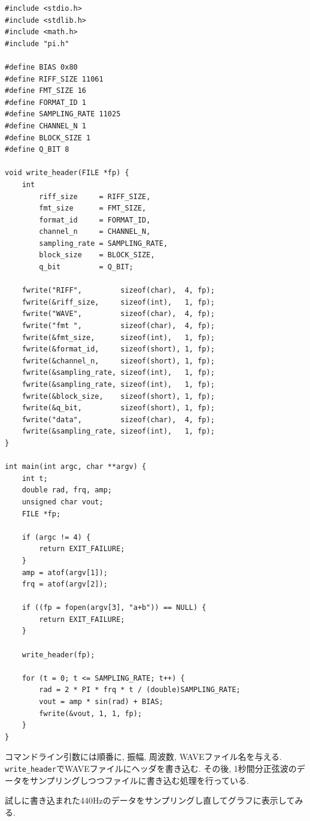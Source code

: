 \documentclass[titlepage]{jsarticle}
\begin{document}
        \begin{lstlisting}[caption=rec-m8.c, label=src:rec]
#include <stdio.h>
#include <stdlib.h>
#include <math.h>
#include "pi.h"

#define BIAS 0x80
#define RIFF_SIZE 11061
#define FMT_SIZE 16
#define FORMAT_ID 1
#define SAMPLING_RATE 11025
#define CHANNEL_N 1
#define BLOCK_SIZE 1
#define Q_BIT 8

void write_header(FILE *fp) {
    int
        riff_size     = RIFF_SIZE,
        fmt_size      = FMT_SIZE,
        format_id     = FORMAT_ID,
        channel_n     = CHANNEL_N,
        sampling_rate = SAMPLING_RATE,
        block_size    = BLOCK_SIZE,
        q_bit         = Q_BIT;

    fwrite("RIFF",         sizeof(char),  4, fp);
    fwrite(&riff_size,     sizeof(int),   1, fp);
    fwrite("WAVE",         sizeof(char),  4, fp);
    fwrite("fmt ",         sizeof(char),  4, fp);
    fwrite(&fmt_size,      sizeof(int),   1, fp);
    fwrite(&format_id,     sizeof(short), 1, fp);
    fwrite(&channel_n,     sizeof(short), 1, fp);
    fwrite(&sampling_rate, sizeof(int),   1, fp);
    fwrite(&sampling_rate, sizeof(int),   1, fp);
    fwrite(&block_size,    sizeof(short), 1, fp);
    fwrite(&q_bit,         sizeof(short), 1, fp);
    fwrite("data",         sizeof(char),  4, fp);
    fwrite(&sampling_rate, sizeof(int),   1, fp);
}

int main(int argc, char **argv) {
    int t;
    double rad, frq, amp;
    unsigned char vout;
    FILE *fp;

    if (argc != 4) {
        return EXIT_FAILURE;
    }
    amp = atof(argv[1]);
    frq = atof(argv[2]);

    if ((fp = fopen(argv[3], "a+b")) == NULL) {
        return EXIT_FAILURE;
    }

    write_header(fp);

    for (t = 0; t <= SAMPLING_RATE; t++) {
        rad = 2 * PI * frq * t / (double)SAMPLING_RATE;
        vout = amp * sin(rad) + BIAS;
        fwrite(&vout, 1, 1, fp);
    }
}
            \end{lstlisting}

            コマンドライン引数には順番に, 振幅, 周波数, WAVEファイル名を与える.
            \verb|write_header|でWAVEファイルにヘッダを書き込む.
            その後, 1秒間分正弦波のデータをサンプリングしつつファイルに書き込む処理を行っている.

            試しに書き込まれた440Hzのデータをサンプリングし直してグラフに表示してみる.
\end{document}
